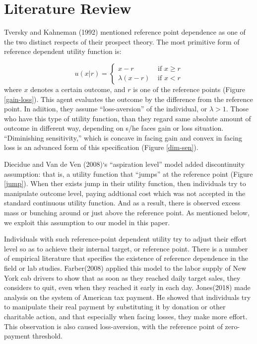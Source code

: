 \documentclass[dvipdfmx, 12pt]{article}
\begin{document}
\section{Literature Review}

  Tversky and Kahneman (1992) mentioned reference point dependence as one of the two distinct respects of their prospect theory. The most primitive form of reference dependent utility function is:

   \[
  u(x | r) = \begin{cases}
  x - r & \text{ if }x \geq r \\
  \lambda (x - r) & \text{ if }x < r
\end{cases}
  \]
  where $x$ denotes a certain outcome, and $r$ is one of the reference points (Figure \ref{gain-loss}). This agent evaluates the outcome by the difference from the reference point. In adiition, they assume ``loss-aversion'' of the individual, or $\lambda > 1$. Those who have this type of utility function, than they regard same absolute amount of outcome in different way, depending on s/he faces gain or loss situation. ``Diminishing sensitivity,'' which is concave in facing gain and convex in facing loss is an advanced form of this specification (Figure \ref{dim-sen}).

  Diecidue and Van de Ven (2008)`s ``aspiration level'' model added discontinuity assumption: that is, a utility function that ``jumps'' at the reference point (Figure \ref{jump}). When ther exists jump in their utility function, then individuals try to manipulate outcome level, paying addtional cost which was not accepted in the standard continuous utility function. And as a result, there is observed excess mass or bunching around or just above the reference point. As mentioned below, we exploit this assumption to our model in this paper.

  Individuals with such reference-point dependent utility try to adjust their effort level so as to achieve their internal target, or reference point. There is a number of empirical literature that specifies the existence of reference dependence in the field or lab studies. Farber(2008) applied this model to the labor supply of New York cab drivers to show that as soon as they reached daily target sales, they considers to quit, even when they reached it early in each day. Jones(2018) made analysis on the system of American tax payment. He showed that individuals try to manipulate their real payment by substituting it by donation or other charitable action, and that especially when facing losses, they make more effort. This observation is also caused loss-aversion, with the reference point of zero-payment threshold.
\end{document}
